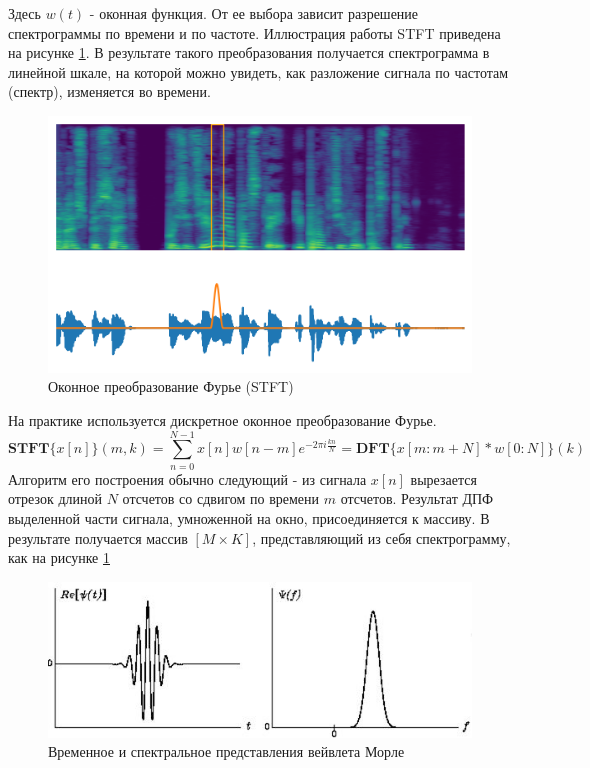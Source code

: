 Здесь \(w(t)\) - оконная функция. От ее выбора зависит разрешение спектрограммы по времени и по частоте. Иллюстрация работы STFT приведена на рисунке \ref{fig:stft}.
В результате такого преобразования получается спектрограмма в линейной шкале, на которой можно увидеть, как разложение сигнала по частотам (спектр), изменяется во времени.

\begin{figure}[t]
  \centering
  \includegraphics[width=0.8\linewidth]{figures/stft}
  \caption{Оконное преобразование Фурье (STFT)}
  \label{fig:stft}
\end{figure}

На практике используется дискретное оконное преобразование Фурье.
\begin{equation}
  \textbf{STFT}\{x[n]\} (m, k) = \sum_{n=0}^{N-1} x[n] w[n - m] e^{-2\pi i  \frac{k n}{N}} = \textbf{DFT}\{x[m:m+N] * w[0:N]\}(k)
  \label{eq:stft}
\end{equation}
Алгоритм его построения обычно следующий - из сигнала \(x[n]\) вырезается отрезок длиной \(N\) отсчетов со сдвигом по времени \(m\) отсчетов. 
Результат ДПФ выделенной части сигнала, умноженной на окно, присоединяется к массиву. В результате получается массив \([M \times K]\), 
представляющий из себя спектрограмму, как на рисунке \ref{fig:stft}

\begin{figure}
  \includegraphics[width=0.9\linewidth]{figures/wavelet}
  \caption{Временное и спектральное представления вейвлета Морле \cite{MorleWavelet}}
  \label{fig:wavelet}
\end{figure}

